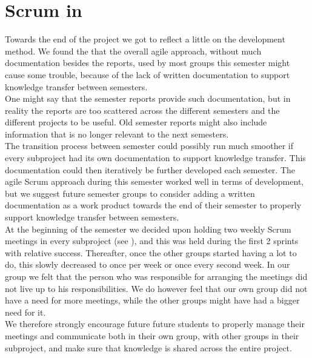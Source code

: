 
\section{Scrum in \giraf}

Towards the end of the project we got to reflect a little on the \giraf development method. We found the that the overall agile approach, without much documentation besides the reports, used by most groups this semester might cause some trouble, because of the lack of written documentation to support knowledge transfer between semesters. \\

One might say that the semester reports provide such documentation, but in reality the reports are too scattered across the different semesters and the different projects to be useful. Old semester reports might also include information that is no longer relevant to the next semesters. \\

The transition process between semester could possibly run much smoother if every subproject had its own documentation to support knowledge transfer. This documentation could then iteratively be further developed each semester. The agile Scrum approach during this semester worked well in terms of development, but we suggest future semester groups to consider adding a written documentation as a work product towards the end of their semester to properly support knowledge transfer between semesters.\\

At the beginning of the semester we decided upon holding two weekly Scrum meetings in every subproject (see ), and this was held during the first 2 sprints with relative success. Thereafter, once the other groups started having a lot to do, this slowly decreased to once per week or once every second week. In our group we felt that the person who was responsible for arranging the meetings did not live up to his responsibilities. We do however feel that our own group did not have a need for more meetings, while the other groups might have had a bigger need for it. \\

We therefore strongly encourage future future students to properly manage their meetings and communicate both in their own group, with other groups in their subproject, and make sure that knowledge is shared across the entire project. 